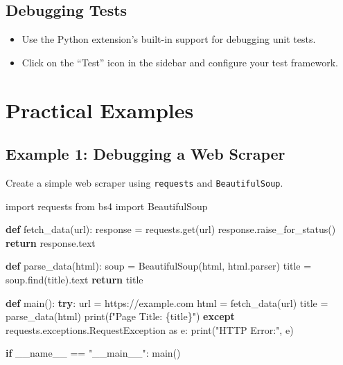 \documentclass[
  letterpaper,
  DIV=11,
  numbers=noendperiod]{scrreprt}
\newenvironment{Shaded}{\begin{snugshade}}{\end{snugshade}}
\newcommand{\BuiltInTok}[1]{\textcolor[rgb]{0.00,0.23,0.31}{#1}}
\newcommand{\ControlFlowTok}[1]{\textcolor[rgb]{0.00,0.23,0.31}{\textbf{#1}}}
\newcommand{\ImportTok}[1]{\textcolor[rgb]{0.00,0.46,0.62}{#1}}
\newcommand{\KeywordTok}[1]{\textcolor[rgb]{0.00,0.23,0.31}{\textbf{#1}}}
\newcommand{\NormalTok}[1]{\textcolor[rgb]{0.00,0.23,0.31}{#1}}
\newcommand{\OperatorTok}[1]{\textcolor[rgb]{0.37,0.37,0.37}{#1}}
\newcommand{\SpecialCharTok}[1]{\textcolor[rgb]{0.37,0.37,0.37}{#1}}
\newcommand{\SpecialStringTok}[1]{\textcolor[rgb]{0.13,0.47,0.30}{#1}}
\newcommand{\StringTok}[1]{\textcolor[rgb]{0.13,0.47,0.30}{#1}}
\newcommand{\VariableTok}[1]{\textcolor[rgb]{0.07,0.07,0.07}{#1}}
\providecommand{\tightlist}{%
  \setlength{\itemsep}{0pt}\setlength{\parskip}{0pt}}\usepackage{longtable,booktabs,array}
\begin{document}
\subsection{Debugging Tests}\label{debugging-tests}

\begin{itemize}
\tightlist
\item
  Use the Python extension's built-in support for debugging unit tests.
\item
  Click on the ``Test'' icon in the sidebar and configure your test
  framework.
\end{itemize}

\section{Practical Examples}\label{practical-examples-1}

\subsection{Example 1: Debugging a Web
Scraper}\label{example-1-debugging-a-web-scraper}

Create a simple web scraper using \texttt{requests} and
\texttt{BeautifulSoup}.

\begin{Shaded}
\begin{Highlighting}[]
\ImportTok{import}\NormalTok{ requests}
\ImportTok{from}\NormalTok{ bs4 }\ImportTok{import}\NormalTok{ BeautifulSoup}

\KeywordTok{def}\NormalTok{ fetch\_data(url):}
\NormalTok{    response }\OperatorTok{=}\NormalTok{ requests.get(url)}
\NormalTok{    response.raise\_for\_status()}
    \ControlFlowTok{return}\NormalTok{ response.text}

\KeywordTok{def}\NormalTok{ parse\_data(html):}
\NormalTok{    soup }\OperatorTok{=}\NormalTok{ BeautifulSoup(html, }\StringTok{\textquotesingle{}html.parser\textquotesingle{}}\NormalTok{)}
\NormalTok{    title }\OperatorTok{=}\NormalTok{ soup.find(}\StringTok{\textquotesingle{}title\textquotesingle{}}\NormalTok{).text}
    \ControlFlowTok{return}\NormalTok{ title}

\KeywordTok{def}\NormalTok{ main():}
    \ControlFlowTok{try}\NormalTok{:}
\NormalTok{        url }\OperatorTok{=} \StringTok{\textquotesingle{}https://example.com\textquotesingle{}}
\NormalTok{        html }\OperatorTok{=}\NormalTok{ fetch\_data(url)}
\NormalTok{        title }\OperatorTok{=}\NormalTok{ parse\_data(html)}
        \BuiltInTok{print}\NormalTok{(}\SpecialStringTok{f"Page Title: }\SpecialCharTok{\{}\NormalTok{title}\SpecialCharTok{\}}\SpecialStringTok{"}\NormalTok{)}
    \ControlFlowTok{except}\NormalTok{ requests.exceptions.RequestException }\ImportTok{as}\NormalTok{ e:}
        \BuiltInTok{print}\NormalTok{(}\StringTok{"HTTP Error:"}\NormalTok{, e)}

\ControlFlowTok{if} \VariableTok{\_\_name\_\_} \OperatorTok{==} \StringTok{"\_\_main\_\_"}\NormalTok{:}
\NormalTok{    main()}
\end{Highlighting}
\end{Shaded}
\end{document}
